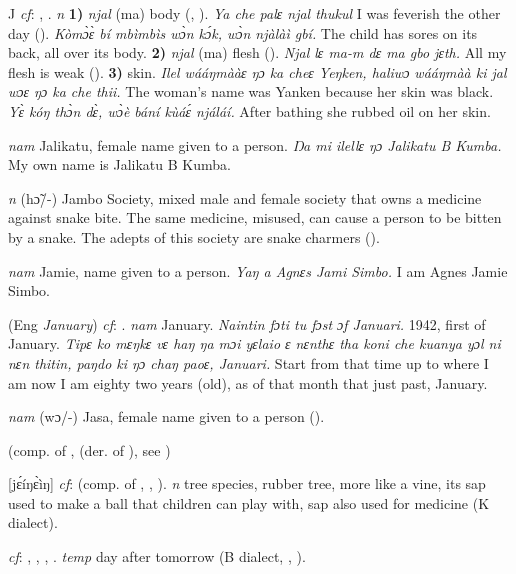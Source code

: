 \begin{letter}{J}
 \textit{cf}: , . \textit{n} \textbf{1)} \textit{njal} (ma) body (\citealt{Pichl1967}, \citealt{Sumner1921}). \textit{Ya che palɛ njal thukul} I was feverish the other day (\citealt{Pichl1967}). \textit{Kòmɔ̀ɛ̀ bí mbìmbìs wɔ̀n kɔ́k, wɔ̀n njàlàì gbí.} The child has sores on its back, all over its body. \textbf{2)} \textit{njal} (ma) flesh (\citealt{Pichl1967}). \textit{Njal lɛ ma-m dɛ ma gbo jɛth.} All my flesh is weak (\citealt{Pichl1967}). \textbf{3)} skin. \textit{Ilel wááŋmààɛ ŋɔ ka cheɛ Yeŋken, haliwɔ wááŋmàà ki jal wɔɛ ŋɔ ka che thii.} The woman's name was Yanken because her skin was black. \textit{Yɛ̀ kóŋ thɔ̀n dɛ̀, wɔ̀è bání kùáɛ́ njáláí.} After bathing she rubbed oil on her skin. 

 \textit{nam} Jalikatu, female name given to a person. \textit{Ŋa mi ilellɛ ŋɔ Jalikatu B Kumba.} My own name is Jalikatu B Kumba.

 \textit{n} (hɔ̃/-) Jambo Society, mixed male and female society that owns a medicine against snake bite. The same medicine, misused, can cause a person to be bitten by a snake. The adepts of this society are snake charmers (\citealt{Pichl1967}).

 \textit{nam} Jamie, name given to a person. \textit{Yaŋ a Agnɛs Jami Simbo.} I am Agnes Jamie Simbo.

 (Eng \textit{January}) \textit{cf}: . \textit{nam} January. \textit{Naintin fɔti tu fɔst ɔf Januari.} 1942, first of January. \textit{Tipɛ ko mɛŋkɛ vɛ haŋ ŋa mɔi yɛlaio ɛ nɛnthɛ tha koni che kuanya yɔl ni nɛn thitin, paŋdo ki ŋɔ chaŋ paoɛ, Januari.} Start from that time up to where I am now I am eighty two years (old), as of that month that just past, January.

 \textit{nam} (wɔ/-) Jasa, female name given to a person (\citealt{Pichl1967}). 

 (comp. of ,  (der. of ), see ) 

 [jɛ́íŋɛ̀ìŋ] \textit{cf}:  (comp. of , , ). \textit{n} tree species, rubber tree, more like a vine, its sap used to make a ball that children can play with, sap also used for medicine (K dialect).

 \textit{cf}: , , , . \textit{temp} day after tomorrow (B dialect, \citealt{Pichl1967}, \citealt{Sumner1921}). 


\end{letter}
